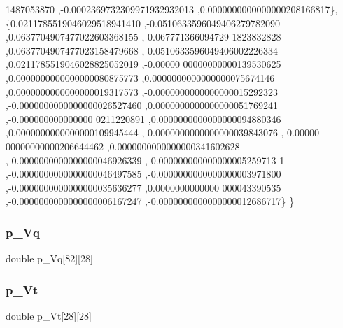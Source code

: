 \begin{DoxyCode}
      1487053870 ,-0.0002369732309971932932013 ,0.0000000000000000208166817\},
\{0.0211785519046029518941410 ,-0.0510633596049406279782090 ,0.0637704907477022603368155 ,-0.067771366094729
      1823832828 ,0.0637704907477023158479668 ,-0.0510633596049406002226334 ,0.0211785519046028825052019 ,-0.00000
      00000000000139530625 ,0.0000000000000000080875773 ,0.0000000000000000075674146 ,0.0000000000000000019317573 
      ,-0.0000000000000000015292323 ,-0.0000000000000000026527460 ,0.0000000000000000051769241 ,-0.000000000000000
      0211220891 ,0.0000000000000000094880346 ,0.0000000000000000109945444 ,-0.0000000000000000039843076 ,-0.00000
      00000000000206644462 ,0.0000000000000000341602628 ,-0.0000000000000000046926339 ,-0.000000000000000005259713
      1 ,-0.0000000000000000046497585 ,-0.0000000000000000003971800 ,-0.0000000000000000035636277 ,0.0000000000000
      000043390535 ,-0.0000000000000000006167247 ,-0.0000000000000000012686717\}
\}
\end{DoxyCode}
\mbox{\label{a00461_a0bc7e8d2ed7b521988a688d3fdd98d30}} 
\subsubsection{\texorpdfstring{p\+\_\+\+Vq}{p\_Vq}}
{\footnotesize\ttfamily double p\+\_\+\+Vq\mbox{[}82\mbox{]}\mbox{[}28\mbox{]}}

\mbox{\label{a00461_a0c4d78753e5f8f5beb51e7858f4e2dcc}} 
\subsubsection{\texorpdfstring{p\+\_\+\+Vt}{p\_Vt}}
{\footnotesize\ttfamily double p\+\_\+\+Vt\mbox{[}28\mbox{]}\mbox{[}28\mbox{]}}


